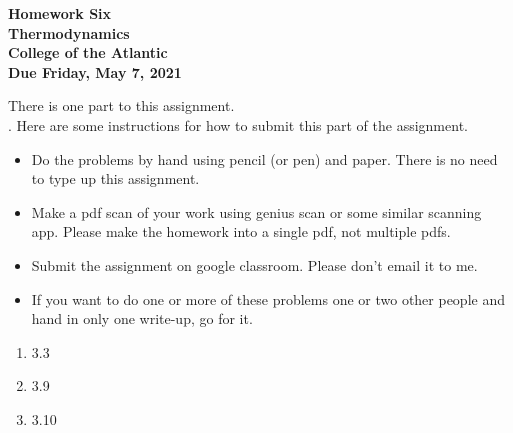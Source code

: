 \documentclass[12pt]{article}
\begin{document}
\pagestyle{empty}
 
\begin{center}
{\LARGE {\bf Homework Six}}\\
\bigskip
{\Large {\bf Thermodynamics}}\\
\bigskip
{\Large {\bf College of the Atlantic}}\\
\bigskip
{ {\bf Due Friday, May 7, 2021}}\\ 
\end{center}
\medskip


\noindent There is one part to this assignment.\\


.  Here are some
instructions for how to submit this part of the assignment.
\begin{itemize}
  \setlength{\itemsep}{1mm}
\item Do the problems by hand using pencil (or pen) and paper.
  There is no need to type up this assignment.
\item Make a pdf scan of your work using genius scan or some
  similar scanning app.  Please make the homework into a single
  pdf, not multiple pdfs.
\item Submit the assignment on google classroom.  Please don't
  email it to me. 
\item If you want to do one or more of these problems one or two other
  people and hand in only one write-up, go for it. \\
\end{itemize}


\begin{enumerate}
\setlength{\itemsep}{1mm}
\item 3.3
\item 3.9
\item 3.10


\end{enumerate}
\end{document}
